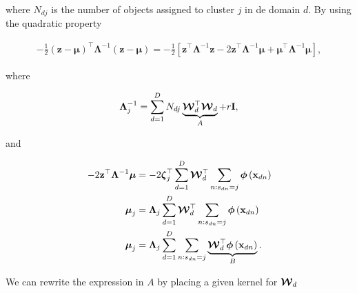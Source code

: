 	where $N_{dj}$ is the number of objects assigned to cluster $j$ in de domain $d$. By using the quadratic property
	
	\begin{align}
	-\frac{1}{2}\left(\mathbf{z}-\boldsymbol{\mu}\right)^\top \boldsymbol{\Lambda}^{-1} \left(\mathbf{z}-\boldsymbol{\mu}\right) = -\frac{1}{2}\left[\mathbf{z}^\top \boldsymbol{\Lambda}^{-1}\mathbf{z} -2\mathbf{z}^\top \boldsymbol{\Lambda}^{-1}\boldsymbol{\mu} + \boldsymbol{\mu}^\top\boldsymbol{\Lambda}^{-1}\boldsymbol{\mu}\right] \label{eq:quadnm},
	\end{align}
	
	where 
	
	\begin{align}
	\boldsymbol{\Lambda}_j^{-1} = \sum_{d=1}^{D} N_{dj}\underbrace{\boldsymbol{\mathcal{W}}_d^\top \boldsymbol{\mathcal{W}}_d}_{A} + r\mathbf{I},
	\end{align}
	
	and
	
	\begin{align}
	-2\mathbf{z}^\top \boldsymbol{\Lambda}^{-1}\boldsymbol{\mu} &=  -2 \boldsymbol{\zeta}_j^\top  \sum_{d=1}^{D}\boldsymbol{\mathcal{W}}_d^\top \sum_{n:s_{dn}=j}\boldsymbol{\phi}\left(\mathbf{x}_{dn}\right) \notag \\
	\boldsymbol{\mu}_j &= \boldsymbol{\Lambda}_j  \sum_{d=1}^{D}\boldsymbol{\mathcal{W}}_d^\top \sum_{n:s_{dn}=j}\boldsymbol{\phi}\left(\mathbf{x}_{dn}\right) \notag \\
	\boldsymbol{\mu}_j &= \boldsymbol{\Lambda}_j  \sum_{d=1}^{D} \sum_{n:s_{dn}=j}\underbrace{ \boldsymbol{\mathcal{W}}_d^\top\boldsymbol{\phi}\left(\mathbf{x}_{dn}\right)}_{B}.
	\end{align}
	
	We can rewrite the expression in $A$ by placing a given kernel for $\boldsymbol{\mathcal{W}}_d$
	
